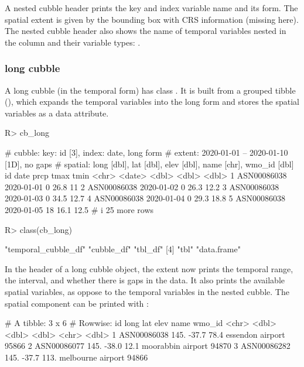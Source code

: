 \documentclass[
  shortnames]{jss}
\begin{document}
A nested cubble header prints the key and index variable name and its form. The spatial extent is given by the bounding box with CRS information (missing here). The nested cubble header also shows the name of temporal variables nested in the  column and their variable types: .

\hypertarget{long-cubble}{%
\subsubsection{long cubble}\label{long-cubble}}

A long cubble (in the temporal form) has class . It is built from a grouped tibble (), which expands the temporal variables into the long form and stores the spatial variables as a data attribute.

\begin{CodeChunk}
\begin{CodeInput}
R> cb_long
\end{CodeInput}
\begin{CodeOutput}
# cubble:  key: id [3], index: date, long form
# extent:  2020-01-01 -- 2020-01-10 [1D], no gaps
# spatial: long [dbl], lat [dbl], elev [dbl], name [chr], wmo_id [dbl]
  id          date        prcp  tmax  tmin
  <chr>       <date>     <dbl> <dbl> <dbl>
1 ASN00086038 2020-01-01     0  26.8  11  
2 ASN00086038 2020-01-02     0  26.3  12.2
3 ASN00086038 2020-01-03     0  34.5  12.7
4 ASN00086038 2020-01-04     0  29.3  18.8
5 ASN00086038 2020-01-05    18  16.1  12.5
# i 25 more rows
\end{CodeOutput}
\begin{CodeInput}
R> class(cb_long)
\end{CodeInput}
\begin{CodeOutput}
[1] "temporal_cubble_df" "cubble_df"          "tbl_df"            
[4] "tbl"                "data.frame"        
\end{CodeOutput}
\end{CodeChunk}

In the header of a long cubble object, the extent now prints the temporal range, the interval, and whether there is gaps in the data. It also prints the available spatial variables, as oppose to the temporal variables in the nested cubble. The spatial component can be printed with :

\begin{CodeChunk}
\begin{CodeOutput}
# A tibble: 3 x 6
# Rowwise: 
  id           long   lat  elev name              wmo_id
  <chr>       <dbl> <dbl> <dbl> <chr>              <dbl>
1 ASN00086038  145. -37.7  78.4 essendon airport   95866
2 ASN00086077  145. -38.0  12.1 moorabbin airport  94870
3 ASN00086282  145. -37.7 113.  melbourne airport  94866
\end{CodeOutput}
\end{CodeChunk}
\end{document}
